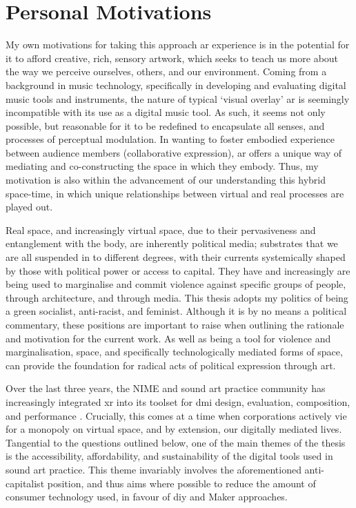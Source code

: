 \section{Personal Motivations}\label{sec: introduction-motivations}
My own motivations for taking this approach \gls{ar} experience is in the potential for it to afford creative, rich, sensory artwork, which seeks to teach us more about the way we perceive ourselves, others, and our environment. Coming from a background in music technology, specifically in developing and evaluating digital music tools and instruments, the nature of typical `visual overlay' \gls{ar} is seemingly incompatible with its use as a digital music tool. As such, it seems not only possible, but reasonable for it to be redefined to encapsulate all senses, and processes of perceptual modulation. In wanting to foster embodied experience between audience members (collaborative expression), \gls{ar} offers a unique way of mediating and co-constructing the space in which they embody. Thus, my motivation is also within the advancement of our understanding this hybrid space-time, in which unique relationships between virtual and real processes are played out.

Real space, and increasingly virtual space, due to their pervasiveness and entanglement with the body, are inherently political media; substrates that we are all suspended in to different degrees, with their currents systemically shaped by those with political power or access to capital. They have and increasingly are being used to marginalise and commit violence against specific groups of people, through architecture, and through media. This thesis adopts my politics of being a green socialist, anti-racist, and feminist. Although it is by no means a political commentary, these positions are important to raise when outlining the rationale and motivation for the current work. As well as being a tool for violence and marginalisation, space, and specifically technologically mediated forms of space, can provide the foundation for radical acts of political expression through art.

Over the last three years, the NIME and sound art practice community has increasingly integrated \gls{xr} into its toolset for \gls{dmi} design, evaluation, composition, and performance \citep[e.g.][]{chevalier2017,lee2020,camci2021}. Crucially, this comes at a time when corporations actively vie for a monopoly on virtual space, and by extension, our digitally mediated lives. Tangential to the questions outlined below, one of the main themes of the thesis is the accessibility, affordability, and sustainability of the digital tools used in sound art practice. This theme invariably involves the aforementioned anti-capitalist position, and thus aims where possible to reduce the amount of consumer technology used, in favour of \gls{diy} and Maker approaches.



